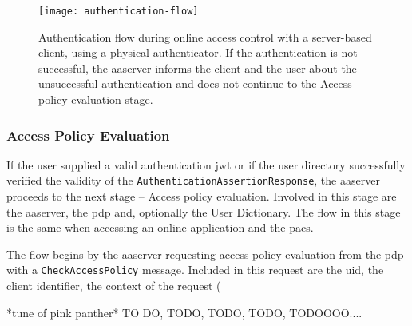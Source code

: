 \begin{sidewaysfigure}[ht]
    \centering
    \texttt{[image: authentication-flow]}
    \caption{Authentication flow during online access control with a server-based client, using a physical authenticator. If the authentication is not successful, the \acrshort{aaserver} informs the client and the user about the unsuccessful authentication and does not continue to the Access policy evaluation stage.}
    \label{fig:authentication-flow}
\end{sidewaysfigure}

\subsubsection{Access Policy Evaluation}
If the user supplied a valid authentication \acrshort{jwt} or if the user directory successfully verified the validity of the \texttt{AuthenticationAssertionResponse}, the \acrshort{aaserver} proceeds to the next stage -- Access policy evaluation. Involved in this stage are the \acrshort{aaserver}, the \acrshort{pdp} and, optionally the User Dictionary. The flow in this stage is the same when accessing an online application and the \acrshort{pacs}.

The flow begins by the \acrshort{aaserver} requesting access policy evaluation from the \acrshort{pdp} with a \texttt{CheckAccessPolicy} message. Included in this request are the \acrshort{uid}, the client identifier, the context of the request (

*tune of pink panther*
TO DO, TODO, TODO, TODO, TODOOOO....